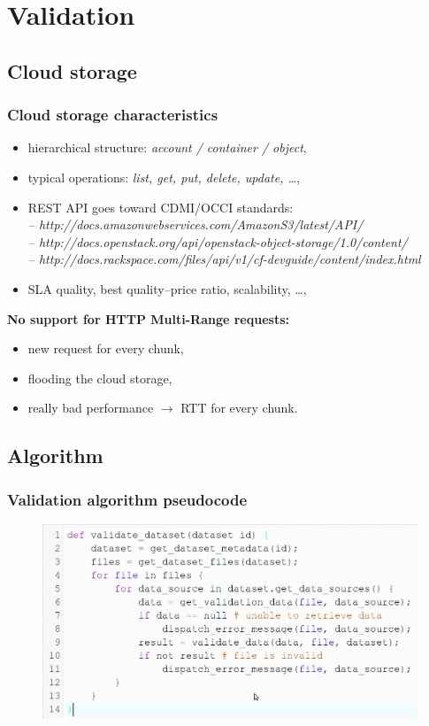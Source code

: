 \documentclass[compress]{beamer}
\begin{document}
\section{Validation}

\subsection{Cloud storage}
\begin{frame}
\frametitle{\textbf{Cloud storage characteristics}}
\begin{itemize}
	\item hierarchical structure: \textit{account / container / object},
	\item typical operations: \textit{list, get, put, delete, update, \ldots},
	\item REST API goes toward CDMI/OCCI standards:\\
		\tiny
		\textit{-- http://docs.amazonwebservices.com/AmazonS3/latest/API/\\
			-- http://docs.openstack.org/api/openstack-object-storage/1.0/content/\\
			-- http://docs.rackspace.com/files/api/v1/cf-devguide/content/index.html\\
		}
		\normalsize
	\item SLA quality, best quality--price ratio, scalability, \ldots,
\end{itemize}
\begin{block}{\textbf{No support for HTTP Multi-Range requests:}}
\begin{itemize}
	\item new request for every chunk,
	\item flooding the cloud storage,
	\item really bad performance $\rightarrow$ RTT for every chunk.
\end{itemize}
\end{block}
\end{frame}

\subsection{Algorithm}
\begin{frame}
\frametitle{\textbf{Validation algorithm pseudocode}}
\begin{figure}
	\centering
	\includegraphics[width=\textwidth]{img/algorithm.png}
\end{figure}
\end{frame}
\end{document}
